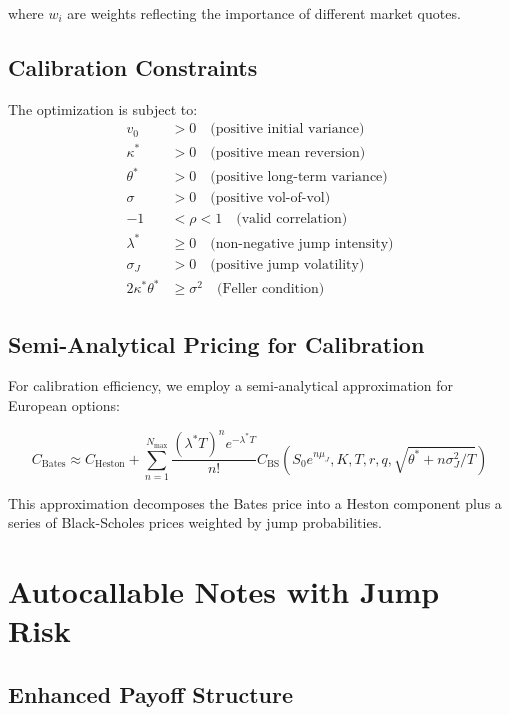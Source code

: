\documentclass[12pt,a4paper]{article}
\begin{document}
where $w_i$ are weights reflecting the importance of different market quotes.

\subsection{Calibration Constraints}

The optimization is subject to:
\begin{align}
v_0 &> 0 \quad \text{(positive initial variance)}\\
\kappa^* &> 0 \quad \text{(positive mean reversion)}\\
\theta^* &> 0 \quad \text{(positive long-term variance)}\\
\sigma &> 0 \quad \text{(positive vol-of-vol)}\\
-1 &< \rho < 1 \quad \text{(valid correlation)}\\
\lambda^* &\geq 0 \quad \text{(non-negative jump intensity)}\\
\sigma_J &> 0 \quad \text{(positive jump volatility)}\\
2\kappa^*\theta^* &\geq \sigma^2 \quad \text{(Feller condition)}
\end{align}

\subsection{Semi-Analytical Pricing for Calibration}

For calibration efficiency, we employ a semi-analytical approximation for European options:

\begin{equation}
C_{\text{Bates}} \approx C_{\text{Heston}} + \sum_{n=1}^{N_{\text{max}}} \frac{(\lambda^* T)^n e^{-\lambda^* T}}{n!} C_{\text{BS}}(S_0 e^{n\mu_J}, K, T, r, q, \sqrt{\theta^* + n\sigma_J^2/T})
\end{equation}

This approximation decomposes the Bates price into a Heston component plus a series of Black-Scholes prices weighted by jump probabilities.

\section{Autocallable Notes with Jump Risk}

\subsection{Enhanced Payoff Structure}
\end{document}
